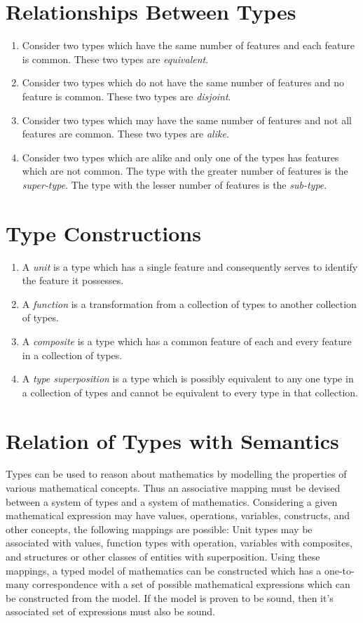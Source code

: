 \documentclass{article}
\begin{document}
\section*{Relationships Between Types}
\begin{enumerate}
    \item Consider two types which have the same number of features and each feature is common. These two types are \textit{equivalent}.
    \item Consider two types which do not have the same number of features and no feature is common. These two types are \textit{disjoint}.
    \item Consider two types which may have the same number of features and not all features are common. These two types are \textit{alike}.
    \item Consider two types which are alike and only one of the types has features which are not common. The type with the greater number of features is the \textit{super-type}. The type with the lesser number of features is the \textit{sub-type}.
\end{enumerate}

\section*{Type Constructions}
\begin{enumerate}
    \item A \textit{unit} is a type which has a single feature and consequently serves to identify the feature it possesses.
    \item A \textit{function} is a transformation from a collection of types to another collection of types.
    \item A \textit{composite} is a type which has a common feature of each and every feature in a collection of types.
    \item A \textit{type superposition} is a type which is possibly equivalent to any one type in a collection of types and cannot be equivalent to every type in that collection.
\end{enumerate}


\section*{Relation of Types with Semantics}
Types can be used to reason about mathematics by modelling the properties of various mathematical concepts.
Thus an associative mapping must be devised between a system of types and a system of mathematics.
Considering a given mathematical expression may have values, operations, variables, constructs, and other concepts, the following mappings are possible:
Unit types may be associated with values, function types with operation, variables with composites, and structures or other classes of entities with superposition.
Using these mappings, a typed model of mathematics can be constructed which has a one-to-many correspondence with a set of possible mathematical expressions which can be constructed from the model.
If the model is proven to be sound, then it's associated set of expressions must also be sound.
\end{document}
